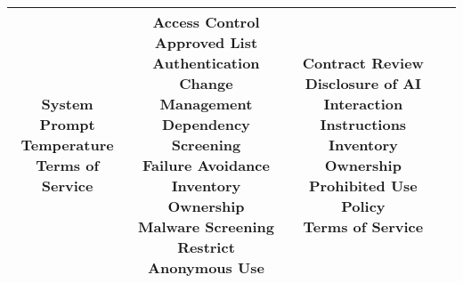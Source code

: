 \documentclass[fleqn]{article}
\begin{document}
\begin{table}[H]
\begin{tabular}{|c|c|c|c|}
{			\textbullet\hspace{3pt} System Prompt\\ 	
			\textbullet\hspace{3pt} Temperature\\ 	
			\textbullet\hspace{3pt} Terms of Service\\ 	
		}
		& \makecell[l]{ 	
			\textbullet\hspace{3pt} Access Control\\ 	
			\textbullet\hspace{3pt} Approved List\\ 	
			\textbullet\hspace{3pt} Authentication\\ 	
			\textbullet\hspace{3pt} Change Management\\ 	
			\textbullet\hspace{3pt} Dependency Screening\\ 	
			\textbullet\hspace{3pt} Failure Avoidance\\ 	
			\textbullet\hspace{3pt} Inventory\\ 	
			\textbullet\hspace{3pt} Ownership\\ 	
			\textbullet\hspace{3pt} Malware Screening\\ 
			\textbullet\hspace{3pt} Restrict Anonymous Use\\ 	
		} 
		& \makecell[l]{ 	
			\textbullet\hspace{3pt} Contract Review\\ 	
			\textbullet\hspace{3pt} Disclosure of AI Interaction\\ 	
			\textbullet\hspace{3pt} Instructions\\ 	
			\textbullet\hspace{3pt} Inventory\\ 	
			\textbullet\hspace{3pt} Ownership\\ 	
			\textbullet\hspace{3pt} Prohibited Use Policy\\ 	
			\textbullet\hspace{3pt} Terms of Service\\ 	
		} \\
		\hline
	\end{tabular}
	\label{table:low_risk_plan_by_gai_risk_cont2}
\end{table}
\end{document}
